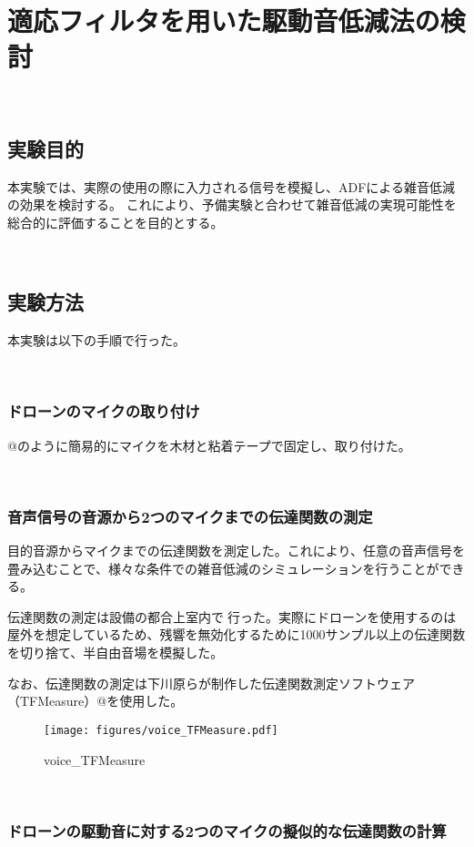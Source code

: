\
\chapter{適応フィルタを用いた駆動音低減法の検討}\label{adf-practice}

\
\section{実験目的}\label{purpose-practice}

本実験では、実際の使用の際に入力される信号を模擬し、ADFによる雑音低減の効果を検討する。
これにより、予備実験と合わせて雑音低減の実現可能性を総合的に評価することを目的とする。

\
\section{実験方法}\label{instruction-practice}

本実験は以下の手順で行った。

\
\subsection{ドローンのマイクの取り付け}\label{installment-mic}

@のように簡易的にマイクを木材と粘着テープで固定し、取り付けた。

\
\subsection{音声信号の音源から2つのマイクまでの伝達関数の測定}\label{observation-tf}

目的音源からマイクまでの伝達関数を測定した。これにより、任意の音声信号を畳み込むことで、様々な条件での雑音低減のシミュレーションを行うことができる。

伝達関数の測定は設備の都合上室内で行った。実際にドローンを使用するのは屋外を想定しているため、残響を無効化するために1000サンプル以上の伝達関数を切り捨て、半自由音場を模擬した。

なお、伝達関数の測定は下川原らが制作した伝達関数測定ソフトウェア（TFMeasure）@を使用した。

\begin{figure}[H]
\centering
\texttt{[image: figures/voice\_TFMeasure.pdf]}
\caption{voice\_TFMeasure}
\end{figure}

\
\subsection{ドローンの駆動音に対する2つのマイクの擬似的な伝達関数の計算}\label{pseudo-tf}

